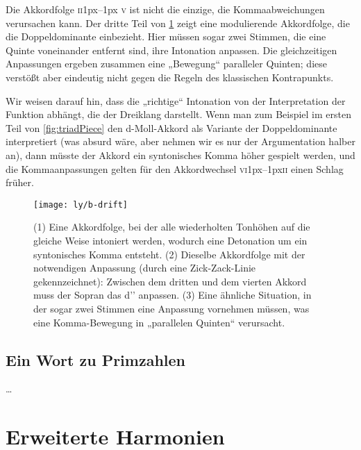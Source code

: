 \documentclass[ngerman,11pt]{scrartcl}
\begin{document}
Die Akkordfolge \textsc{ii}\kern1px–\kern1px \textsc{v} ist nicht die einzige,
die Kommaabweichungen verursachen kann. Der dritte Teil von \cref{fig:drift}
zeigt eine modulierende Akkordfolge, die die Doppeldominante einbezieht. Hier
müssen sogar zwei Stimmen, die eine Quinte voneinander entfernt sind, ihre
Intonation anpassen. Die gleichzeitigen Anpassungen ergeben zusammen eine
„Bewegung“ paralleler Quinten; diese verstößt aber eindeutig nicht gegen die
Regeln des klassischen Kontrapunkts.

Wir weisen darauf hin, dass die „richtige“ Intonation von der Interpretation der
Funktion abhängt, die der Dreiklang darstellt. Wenn man zum Beispiel im ersten
Teil von \cref{fig:triadPiece} den d-Moll-Akkord als Variante der
Doppeldominante interpretiert (was absurd wäre,
aber nehmen wir es nur der Argumentation halber an), dann müsste der Akkord ein
syntonisches Komma höher gespielt werden, und die Kommaanpassungen gelten für
den Akkordwechsel \textsc{vi}\kern1px–\kern1px\textsc{ii} einen Schlag früher.

\begin{figure}
  \centering
  \texttt{[image: ly/b-drift]}
  \caption{(1) Eine Akkordfolge, bei der alle wiederholten Tonhöhen auf die   
  	gleiche Weise intoniert werden, wodurch eine Detonation um ein syntonisches
  	Komma entsteht.%
  	\quad(2) Dieselbe Akkordfolge mit der notwendigen Anpassung (durch eine
  	Zick-Zack-Linie gekennzeichnet): Zwischen dem dritten und dem vierten Akkord
  	muss der Sopran das d’’ anpassen.%
  	\quad(3) Eine ähnliche Situation, in der sogar zwei Stimmen eine Anpassung
  	vornehmen müssen, was eine Komma-Bewegung in „parallelen Quinten“
  	verursacht.}\label{fig:drift}
\end{figure}

\subsection{Ein Wort zu Primzahlen}

…

\section{Erweiterte Harmonien}
\label{sec:quad}
\end{document}
